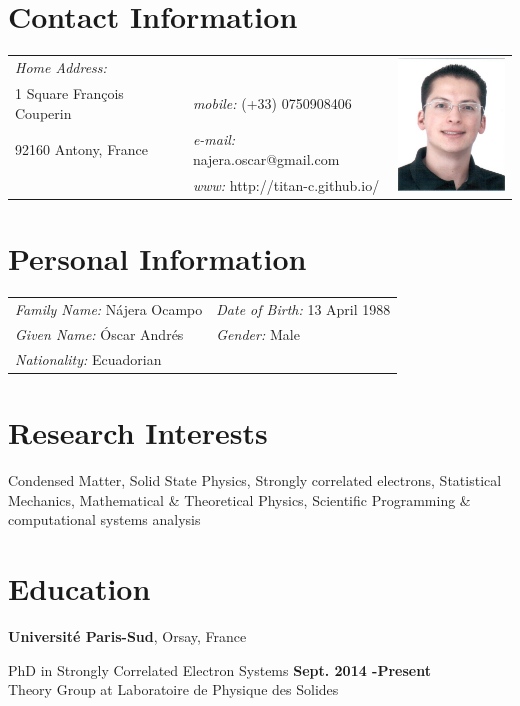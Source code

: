 \documentclass[margin,line]{res}
\newenvironment{list1}{
  \begin{list}{\ding{113}}{%
      \setlength{\itemsep}{0in}
      \setlength{\parsep}{0in} \setlength{\parskip}{0in}
      \setlength{\topsep}{0in} \setlength{\partopsep}{0in}
      \setlength{\leftmargin}{0.17in}}}{\end{list}}
\begin{document}

\begin{resume}

\section{\sc Contact Information}
  \begin{tabular}{@{}p{2in}p{2.5in}p{3cm} }
    {\it Home Address:}    &  &
      \multirow{4}{*}{ \includegraphics[width=3cm,bb=0 0 101 126]{./foto2012.jpg}}\\

    1 Square François Couperin & {\it mobile:} (+33) 0750908406 \\
    92160 Antony, France      & {\it e-mail:}  najera.oscar@gmail.com\\
			      & {\it www:} http://titan-c.github.io/
  \end{tabular}\vspace{0.4cm}

\section{\sc Personal Information}
 \begin{tabular}{ll}
  {\it Family Name:} Nájera Ocampo & {\it Date of Birth:} 13 April 1988\\
  {\it Given Name:} Óscar Andrés   & {\it Gender:} Male\\
  {\it Nationality:} Ecuadorian    & %
 \end{tabular}

\section{\sc Research Interests}
  Condensed Matter, Solid State Physics, Strongly correlated electrons,
  Statistical Mechanics, Mathematical \& Theoretical Physics, Scientific
Programming \& computational systems analysis

\section{\sc Education}
  {\bf Université Paris-Sud}, Orsay, France\\
  \vspace{-.1in}
  \begin{list1}
   \item[] PhD in Strongly Correlated Electron Systems \hfill {\bf Sept. 2014
    -Present} \\
    Theory Group at Laboratoire de Physique des Solides
  \end{list1}


\end{resume}
\end{document}
